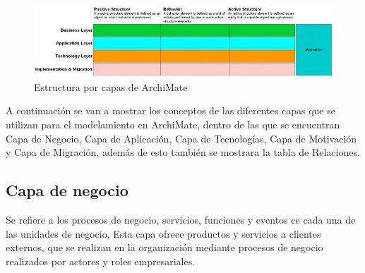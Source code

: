 \begin{figure} [h]
	\centering
	\includegraphics[width=0.7\linewidth]{arquitectura/imagenes/Archimate}
	\caption{Estructura por capas de ArchiMate}
	\label{fig:archimate}
\end{figure}

A continuación se van a mostrar los conceptos de las diferentes capas que se utilizan para el modelamiento en ArchiMate, dentro de las que se encuentran Capa de Negocio, Capa de Aplicación, Capa de Tecnologías, Capa de Motivación y Capa de Migración, además de esto también se mostrara la tabla de Relaciones.

\newpage

\subsection{Capa de negocio}

Se refiere a los procesos de negocio, servicios, funciones y eventos ce cada una de las unidades de negocio. Esta capa ofrece productos y servicios a clientes externos, que se realizan en la organización mediante procesos de negocio realizados por actores y roles empresariales.

